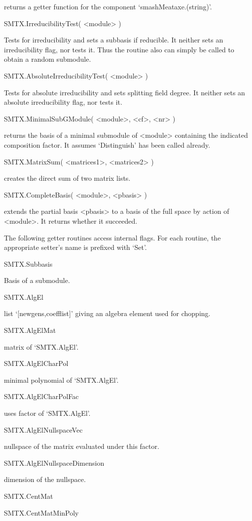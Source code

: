 returns a getter function for the component `smashMeataxe.(string)'.

\>SMTX.IrreducibilityTest( <module> )

Tests for irreducibility and sets a subbasis if reducible. It neither sets
an irreducibility flag, nor tests it. Thus the routine also can simply be
called to obtain a random submodule.

\>SMTX.AbsoluteIrreducibilityTest( <module> )

Tests for absolute irreducibility and sets splitting field degree. It
neither sets an absolute irreducibility flag, nor tests it.

\>SMTX.MinimalSubGModule( <module>, <cf>, <nr> )

returns the basis of a minimal submodule of <module> containing the
indicated composition factor. It assumes `Distinguish' has been called
already.

\>SMTX.MatrixSum( <matrices1>, <matrices2> )

creates the direct sum of two matrix lists.

\>SMTX.CompleteBasis( <module>, <pbasis> )

extends the partial basis <pbasis> to a basis of the full space
by action of <module>. It returns whether it succeeded.


The following getter routines access internal flags. For each routine, the
appropriate setter's name is prefixed with `Set'.

\>SMTX.Subbasis

Basis of a submodule.

\>SMTX.AlgEl

list `[newgens,coefflist]' giving an algebra element used for chopping.

\>SMTX.AlgElMat

matrix of `SMTX.AlgEl'.

\>SMTX.AlgElCharPol

minimal polynomial of `SMTX.AlgEl'.

\>SMTX.AlgElCharPolFac

uses factor of `SMTX.AlgEl'.

\>SMTX.AlgElNullspaceVec

nullspace of the matrix evaluated under this factor.

\>SMTX.AlgElNullspaceDimension

dimension of the nullspace.

\>SMTX.CentMat


\>SMTX.CentMatMinPoly


